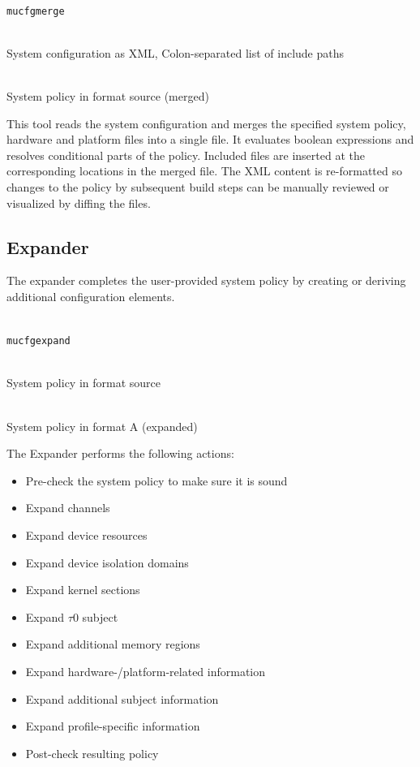 \documentclass[a4paper,twoside,titlepage]{article}
\begin{document}
\begin{description} \itemsep1pt \parskip0pt
	\item[Name] \hfill \\
		\texttt{mucfgmerge}
	\item[Input] \hfill \\
		System configuration as XML, Colon-separated list of include paths
	\item[Output] \hfill \\
		System policy in format source (merged)
\end{description}

This tool reads the system configuration and merges the specified system
policy, hardware and platform files into a single file. It evaluates boolean
expressions and resolves conditional parts of the policy. Included files are
inserted at the corresponding locations in the merged file. The XML content is
re-formatted so changes to the policy by subsequent build steps can be manually
reviewed or visualized by diffing the files.

\subsection{Expander}
\label{sec:tools-expander}
The expander completes the user-provided system policy by creating or deriving
additional configuration elements.

\begin{description} \itemsep1pt \parskip0pt
	\item[Name] \hfill \\
		\texttt{mucfgexpand}
	\item[Input] \hfill \\
		System policy in format source
	\item[Output] \hfill \\
		System policy in format A (expanded)
\end{description}

The Expander performs the following actions:
\begin{itemize}
	\item Pre-check the system policy to make sure it is sound
	\item Expand channels
	\item Expand device resources
	\item Expand device isolation domains
	\item Expand kernel sections
	\item Expand $\tau$0 subject
	\item Expand additional memory regions
	\item Expand hardware-/platform-related information
	\item Expand additional subject information
	\item Expand profile-specific information
	\item Post-check resulting policy
\end{itemize}
\end{document}

